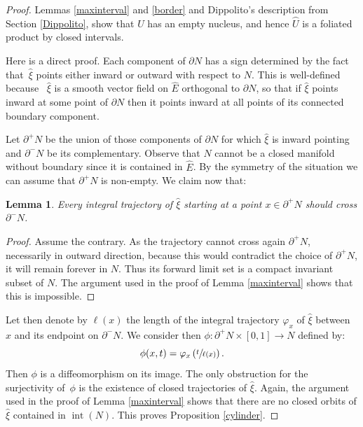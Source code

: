 \documentclass[10pt]{amsart}
\DeclareMathOperator{\inte}{int}
\newtheorem{lemma}[theorem]{Lemma}
\theoremstyle{definition}
\theoremstyle{remark}
\numberwithin{equation}{section}
\begin{document}
\begin{proof}
Lemmas \ref{maxinterval} and \ref{border} and Dippolito's description from Section \ref{Dippolito},
show that $U$ has an empty nucleus, and hence $\wideparen{U}$ is a foliated product by closed intervals.

Here is a direct proof.
Each component of $\partial N$ has a sign determined by
the fact that~$\widehat{\xi}$ points either inward or outward with respect to $N$.
This is well-defined because~ $\widehat{\xi}$ is a smooth vector field on $\widehat{E}$
orthogonal to $\partial N$, so that if $\widehat{\xi}$ points inward at some point of
$\partial N$ then it points inward at all points of its connected boundary component.

Let $\partial^+ N$ be the union of those components of
$\partial N$ for which
$\widehat{\xi}$ is inward pointing and $\partial^- N$ be its complementary.
Observe that $N$ cannot be a closed manifold without boundary since it is
contained in $\widehat{E}$. By the symmetry of the situation we can assume that
$\partial^+ N$ is non-empty.
We claim now that:
\begin{lemma}
Every integral trajectory of $\widehat{\xi}$ starting at a point
$x\in \partial^+ N$ should cross $\partial^- N$.
\end{lemma}
\begin{proof}
Assume the contrary.
As the trajectory cannot cross again $\partial^+ N$,
necessarily in outward direction, because this would contradict the choice of
$\partial^+ N$, it will remain forever in $N$.
Thus its forward limit set is a
compact invariant subset of $N$. The argument used in the proof of Lemma \ref{maxinterval} shows that this is impossible.
\end{proof}

Let then denote by $\ell(x)$ the length of the integral trajectory $\varphi_x$
of $\widehat{\xi}$ between $x$ and its endpoint on $\partial^- N$.
We consider then $\phi: \partial^+ N\times [0,1]\to N$
defined by:
\[ \phi(x,t)= \varphi_x\left(\sfrac{t}{\ell(x)}\right).\]
Then $\phi$ is a diffeomorphism on its image.
The only obstruction for the surjectivity of~$\phi$
is the existence of closed trajectories of $\widehat{\xi}$.
Again, the argument used in the proof of Lemma \ref{maxinterval} shows that
there are no closed orbits of $\widehat{\xi}$ contained in $\inte (N)$.
This proves Proposition \ref{cylinder}.
\end{proof}
\end{document}
